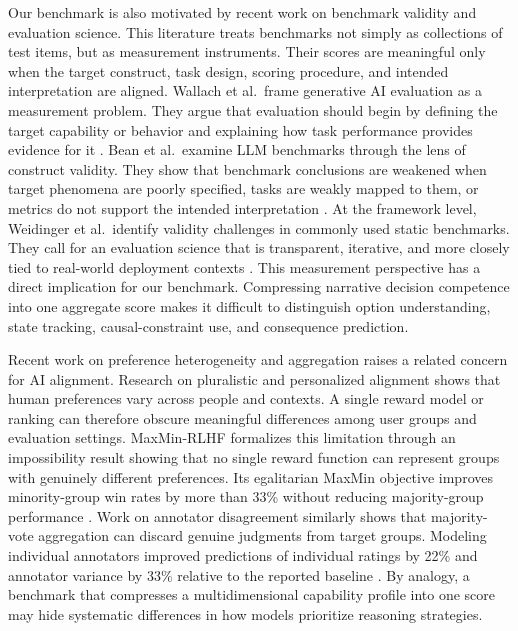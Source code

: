 \documentclass[pdflatex,sn-mathphys-num]{sn-jnl}%
\theoremstyle{thmstyleone}%
\theoremstyle{thmstyletwo}%
\theoremstyle{thmstylethree}%
\begin{document}
Our benchmark is also motivated by recent work on benchmark validity and evaluation science. This literature treats benchmarks not simply as collections of test items, but as measurement instruments. Their scores are meaningful only when the target construct, task design, scoring procedure, and intended interpretation are aligned. Wallach et al.\ frame generative AI evaluation as a measurement problem. They argue that evaluation should begin by defining the target capability or behavior and explaining how task performance provides evidence for it \cite{wallach2025position}. Bean et al.\ examine LLM benchmarks through the lens of construct validity. They show that benchmark conclusions are weakened when target phenomena are poorly specified, tasks are weakly mapped to them, or metrics do not support the intended interpretation \cite{bean2025measuring}. At the framework level, Weidinger et al.\ identify validity challenges in commonly used static benchmarks. They call for an evaluation science that is transparent, iterative, and more closely tied to real-world deployment contexts \cite{weidinger2025evaluation}. This measurement perspective has a direct implication for our benchmark. Compressing narrative decision competence into one aggregate score makes it difficult to distinguish option understanding, state tracking, causal-constraint use, and consequence prediction.

Recent work on preference heterogeneity and aggregation raises a related concern for AI alignment. Research on pluralistic and personalized alignment shows that human preferences vary across people and contexts. A single reward model or ranking can therefore obscure meaningful differences among user groups and evaluation settings. MaxMin-RLHF formalizes this limitation through an impossibility result showing that no single reward function can represent groups with genuinely different preferences. Its egalitarian MaxMin objective improves minority-group win rates by more than 33\% without reducing majority-group performance \cite{chakraborty2024maxmin}. Work on annotator disagreement similarly shows that majority-vote aggregation can discard genuine judgments from target groups. Modeling individual annotators improved predictions of individual ratings by 22\% and annotator variance by 33\% relative to the reported baseline \cite{fleisig2023when}. By analogy, a benchmark that compresses a multidimensional capability profile into one score may hide systematic differences in how models prioritize reasoning strategies. 
\end{document}
